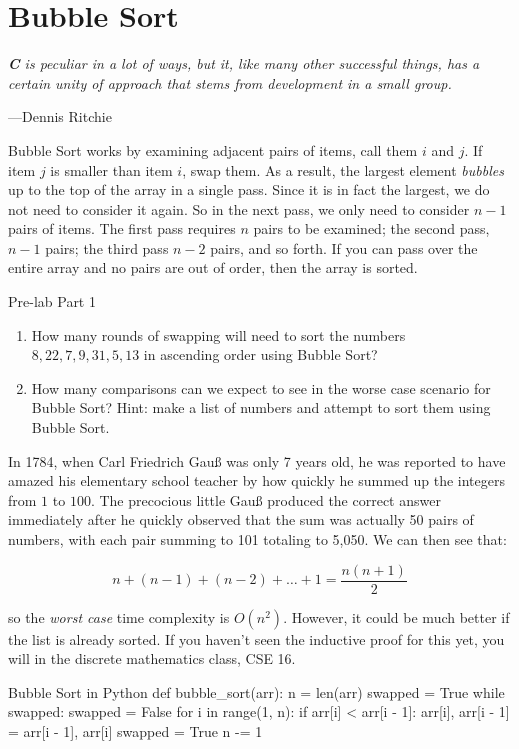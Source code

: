 \section{Bubble Sort}

\epigraph{\emph{\textbf{C} is peculiar in a lot of ways, but it, like
many other successful things, has a certain unity of approach that stems
from development in a small group.}}{---Dennis Ritchie}

\noindent Bubble Sort works by examining adjacent pairs of items, call
them $i$ and $j$. If item $j$ is smaller than item $i$, swap them. As a
result, the largest element \emph{bubbles} up to the top of the array in
a single pass. Since it is in fact the largest, we do not need to
consider it again. So in the next pass, we only need to consider $n-1$
pairs of items. The first pass requires $n$ pairs to be examined; the
second pass, $n-1$ pairs; the third pass $n-2$ pairs, and so forth. If
you can pass over the entire array and no pairs are out of order, then
the array is sorted.

\medskip
\begin{prelab}{Pre-lab Part 1}
  \begin{enumerate}
    \item How many rounds of swapping will need to sort the numbers ${8,
      22, 7, 9, 31, 5, 13}$ in ascending order using Bubble Sort?
    \item How many comparisons can we expect to see in the worse case
      scenario for Bubble Sort? Hint: make a list of numbers and attempt
      to sort them using Bubble Sort.
  \end{enumerate}
\end{prelab}

In 1784, when Carl Friedrich Gau{\ss} was only 7 years old, he was
reported to have amazed his elementary school teacher by how quickly he
summed up the integers from $1$ to $100$. The precocious little
Gau{\ss} produced the correct answer immediately after he quickly
observed that the sum was actually 50 pairs of numbers, with each pair
summing to 101 totaling to 5,050. We can then see that:

\[
  n+(n-1)+(n-2) + \ldots + 1 = \frac{n(n+1)}{2}
\]

\noindent so the \emph{worst case} time complexity is $O(n^2)$. However, it could
be much better if the list is already sorted. If you haven't seen the
inductive proof for this yet, you will in the discrete
mathematics class, CSE 16.

\begin{pylisting}{Bubble Sort in Python}
def bubble_sort(arr):
    n = len(arr)
    swapped = True
    while swapped:
        swapped = False
        for i in range(1, n):
            if arr[i] < arr[i - 1]:
                arr[i], arr[i - 1] = arr[i - 1], arr[i]
                swapped = True
        n -= 1
\end{pylisting}
